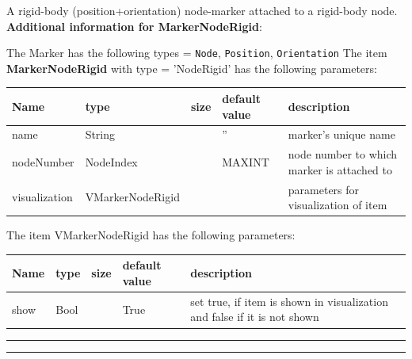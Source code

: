 \label{sec:item:MarkerNodeRigid}
A rigid-body (position+orientation) node-marker attached to a rigid-body node.\vspace{12pt}
 \\{\bf Additional information for MarkerNodeRigid}:
\bi
  \item The Marker has the following types = \texttt{Node}, \texttt{Position}, \texttt{Orientation}
\ei
\vspace{12pt} \noindent The item {\bf MarkerNodeRigid} with type = 'NodeRigid' has the following parameters:\vspace{-1cm}\\ 
\begin{center}
  \footnotesize
  \begin{longtable}{| p{4.5cm} | p{2.5cm} | p{0.5cm} | p{2.5cm} | p{6cm} |}
    \hline
    \bf Name & \bf type & \bf size & \bf default value & \bf description \\ \hline
    name &     String &      &     '' &     marker's unique name\\ \hline
    nodeNumber &     NodeIndex &      &     MAXINT &     node number to which marker is attached to\\ \hline
    visualization & VMarkerNodeRigid & & & parameters for visualization of item \\ \hline
	  \end{longtable}
	\end{center}
The item VMarkerNodeRigid has the following parameters:\vspace{-1cm}\\ 
\begin{center}
  \footnotesize
  \begin{longtable}{| p{4.5cm} | p{2.5cm} | p{0.5cm} | p{2.5cm} | p{6cm} |}
    \hline
    \bf Name & \bf type & \bf size & \bf default value & \bf description \\ \hline
    show &     Bool &      &     True &     set true, if item is shown in visualization and false if it is not shown\\ \hline
	  \end{longtable}
	\end{center}
\par\noindent\rule{\textwidth}{0.4pt}
\label{description_MarkerNodeRigid}
\vspace{6pt}\par\noindent\rule{\textwidth}{0.4pt}
